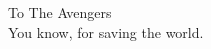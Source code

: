 \begin{dedication}
{\large{To The Avengers}}\\[5mm]
You know, for saving the world.
\end{dedication}

